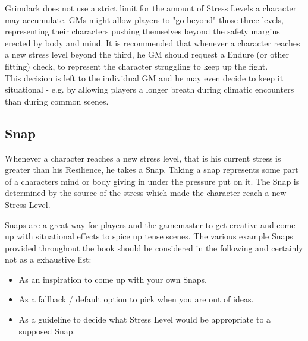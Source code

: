 Grimdark does not use a strict limit for the amount of Stress Levels a character may accumulate.
GMs might allow players to "go beyond" those three levels, representing their characters pushing themselves beyond the safety margins erected by body and mind.
It is recommended that whenever a character reaches a new stress level beyond the third, he GM should request a Endure (or other fitting) check, to represent the character struggling to keep up the fight.\\
This decision is left to the individual GM and he may even decide to keep it situational - e.g. by allowing players a longer breath during climatic encounters than during common scenes.

\subsection{Snap} %
\label{sub:snap}
Whenever a character reaches a new stress level, that is his current stress is greater than his Resilience, he takes a Snap.
Taking a snap represents some part of a characters mind or body giving in under the pressure put on it.
The Snap is determined by the source of the stress which made the character reach a new Stress Level.

Snaps are a great way for players and the gamemaster to get creative and come up with situational effects to spice up tense scenes.
The various example Snaps provided throughout the book should be considered in the following and certainly not as a exhaustive list:
\begin{itemize}
	\item As an inspiration to come up with your own Snaps.
	\item As a fallback / default option to pick when you are out of ideas.
	\item As a guideline to decide what Stress Level would be appropriate to a supposed Snap.
\end{itemize}

